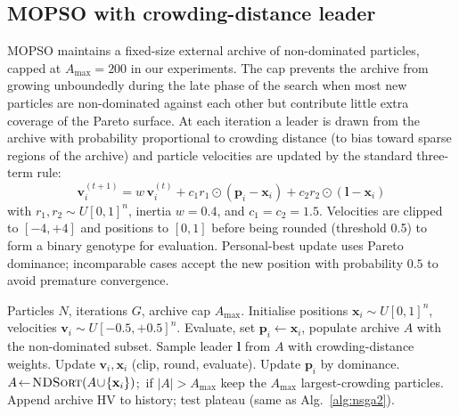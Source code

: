 \documentclass[conference]{IEEEtran}
\begin{document}
\subsection{MOPSO with crowding-distance leader}
\label{subsec:mopso}
MOPSO maintains a fixed-size external archive of non-dominated
particles, capped at $A_{\max}{=}200$ in our experiments. The cap
prevents the archive from growing unboundedly during the late phase
of the search when most new particles are non-dominated against
each other but contribute little extra coverage of the Pareto
surface. At each iteration a leader is drawn from the archive with
probability proportional to crowding distance (to bias toward
sparse regions of the archive) and particle velocities are updated
by the standard three-term rule:
\begin{equation}
  \mathbf{v}_{i}^{(t+1)} = w\,\mathbf{v}_{i}^{(t)}
    + c_{1}r_{1}\!\odot\!(\mathbf{p}_{i}\!-\!\mathbf{x}_{i})
    + c_{2}r_{2}\!\odot\!(\mathbf{l}\!-\!\mathbf{x}_{i})
\end{equation}
with $r_{1},r_{2}\!\sim\!U[0,1]^{n}$, inertia
$w{=}0.4$, and $c_{1}{=}c_{2}{=}1.5$. Velocities are clipped to
$[-4,+4]$ and positions to $[0,1]$ before being rounded (threshold 0.5)
to form a binary genotype for evaluation. Personal-best update uses
Pareto dominance; incomparable cases accept the new position with
probability $0.5$ to avoid premature convergence.

\begin{algorithm}[t]
\caption{MOPSO with Pareto archive}
\label{alg:mopso}
\begin{algorithmic}[1]
  \REQUIRE Particles $N$, iterations $G$, archive cap $A_{\max}$.
  \STATE Initialise positions $\mathbf{x}_{i}\!\sim\!U[0,1]^{n}$,
         velocities $\mathbf{v}_{i}\!\sim\!U[-0.5,+0.5]^{n}$.
  \STATE Evaluate, set $\mathbf{p}_{i}\!\gets\!\mathbf{x}_{i}$, populate
         archive $A$ with the non-dominated subset.
    \STATE Sample leader $\mathbf{l}$ from $A$ with crowding-distance
           weights.
    \STATE Update $\mathbf{v}_{i},\mathbf{x}_{i}$ (clip, round, evaluate).
    \STATE Update $\mathbf{p}_{i}$ by dominance.
    \STATE $A\!\gets\!\textsc{NDSort}(A\!\cup\!\{\mathbf{x}_{i}\})$;\
           if $|A|\!>\!A_{\max}$ keep the $A_{\max}$ largest-crowding
           particles.
    \STATE Append archive HV to history; test plateau (same as
           Alg.~\ref{alg:nsga2}).
  \ENDFOR
\end{algorithmic}
\end{algorithm}
\end{document}
